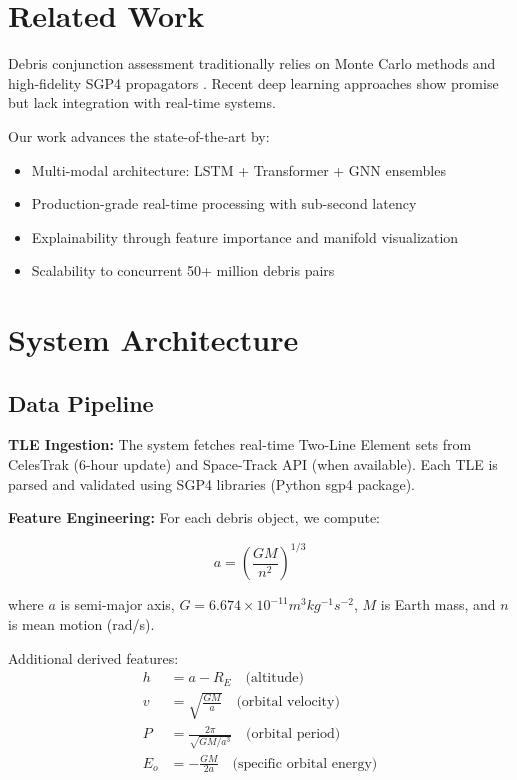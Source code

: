 \documentclass[10pt,conference]{IEEEtran}
\begin{document}
\section{Related Work}

Debris conjunction assessment traditionally relies on Monte Carlo methods and high-fidelity SGP4 propagators \cite{Vallado2006}. Recent deep learning approaches \cite{Battay2021, Sinha2022} show promise but lack integration with real-time systems.

Our work advances the state-of-the-art by:
\begin{itemize}
  \item Multi-modal architecture: LSTM + Transformer + GNN ensembles
  \item Production-grade real-time processing with sub-second latency
  \item Explainability through feature importance and manifold visualization
  \item Scalability to concurrent 50+ million debris pairs
\end{itemize}

\section{System Architecture}

\subsection{Data Pipeline}

\textbf{TLE Ingestion:} The system fetches real-time Two-Line Element sets from CelesTrak (6-hour update) and Space-Track API (when available). Each TLE is parsed and validated using SGP4 libraries (Python sgp4 package).

\textbf{Feature Engineering:} For each debris object, we compute:

\begin{equation}
a = \left(\frac{GM}{n^2}\right)^{1/3}
\end{equation}

where $a$ is semi-major axis, $G = 6.674 \times 10^{-11} m^3 kg^{-1} s^{-2}$, $M$ is Earth mass, and $n$ is mean motion (rad/s).

Additional derived features:
\begin{align}
h &= a - R_E \quad \text{(altitude)} \\
v &= \sqrt{\frac{GM}{a}} \quad \text{(orbital velocity)} \\
P &= \frac{2\pi}{\sqrt{GM/a^3}} \quad \text{(orbital period)} \\
E_o &= -\frac{GM}{2a} \quad \text{(specific orbital energy)}
\end{align}
\end{document}
